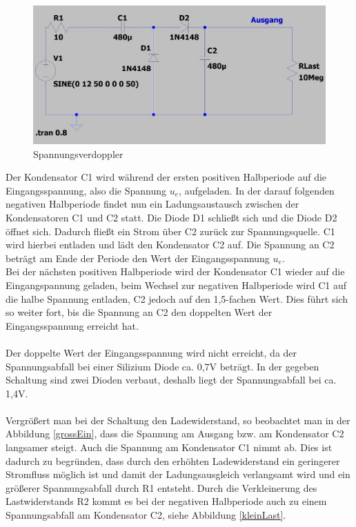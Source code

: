 \begin{figure}[h!]
	\includegraphics[width=\textwidth]{data/bspschaltung}
	\caption{Spannungsverdoppler}
	\label{bspS}
\end{figure}

\newpage

Der Kondensator C1 wird während der ersten positiven Halbperiode auf die Eingangsspannung, also die Spannung $u_{e}$, aufgeladen. In der darauf folgenden negativen Halbperiode findet nun ein Ladungsaustausch zwischen der Kondensatoren C1 und C2 statt. Die Diode D1 schließt sich und die Diode D2 öffnet sich. Dadurch fließt ein Strom über C2 zurück zur Spannungsquelle. C1 wird hierbei entladen und lädt den Kondensator C2 auf. Die Spannung an C2 beträgt am Ende der Periode den Wert der Eingangsspannung $u_{e}$. \\
Bei der nächsten positiven Halbperiode wird der Kondensator C1 wieder auf die Eingangspannung geladen, beim Wechsel zur negativen Halbperiode wird C1 auf die halbe Spannung entladen, C2 jedoch auf den 1,5-fachen Wert. Dies führt sich so weiter fort, bis die Spannung an C2 den doppelten Wert der Eingangsspannung erreicht hat.
\\ \\
Der doppelte Wert der Eingangsspannung wird nicht erreicht, da der Spannungsabfall bei einer Silizium Diode ca. 0,7\si{\volt} beträgt. In der gegeben Schaltung sind zwei Dioden verbaut, deshalb liegt der Spannungsabfall bei ca. 1,4\si{\volt}. 
\\ \\ 
Vergrößert man bei der Schaltung den Ladewiderstand, so beobachtet man in der Abbildung \ref{grossEin}, dass die Spannung am Ausgang bzw. am Kondensator C2 langsamer steigt. Auch die Spannung am Kondensator C1 nimmt ab. Dies ist dadurch zu begründen, dass durch den erhöhten Ladewiderstand ein geringerer Stromfluss möglich ist und damit der Ladungsausgleich verlangsamt wird und ein größerer Spannungsabfall durch R1 entsteht. Durch die Verkleinerung des Lastwiderstands R2 kommt es bei der negativen Halbperiode auch zu einem Spannungsabfall am Kondensator C2, siehe Abbildung \ref{kleinLast}.

